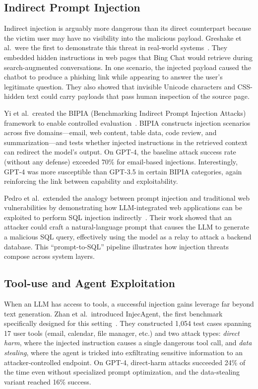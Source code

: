 \subsection{Indirect Prompt Injection}

Indirect injection is arguably more dangerous than its direct counterpart because the victim user may have no visibility into the malicious payload. Greshake et al.\ were the first to demonstrate this threat in real-world systems~\cite{greshake2023indirect}. They embedded hidden instructions in web pages that Bing Chat would retrieve during search-augmented conversations. In one scenario, the injected payload caused the chatbot to produce a phishing link while appearing to answer the user's legitimate question. They also showed that invisible Unicode characters and CSS-hidden text could carry payloads that pass human inspection of the source page.

Yi et al.\ created the BIPIA (Benchmarking Indirect Prompt Injection Attacks) framework to enable controlled evaluation~\cite{yi2023bipia}. BIPIA constructs injection scenarios across five domains---email, web content, table data, code review, and summarization---and tests whether injected instructions in the retrieved context can redirect the model's output. On GPT-4, the baseline attack success rate (without any defense) exceeded 70\% for email-based injections. Interestingly, GPT-4 was more susceptible than GPT-3.5 in certain BIPIA categories, again reinforcing the link between capability and exploitability.

Pedro et al.\ extended the analogy between prompt injection and traditional web vulnerabilities by demonstrating how LLM-integrated web applications can be exploited to perform SQL injection indirectly~\cite{pedro2023prompt}. Their work showed that an attacker could craft a natural-language prompt that causes the LLM to generate a malicious SQL query, effectively using the model as a relay to attack a backend database. This ``prompt-to-SQL'' pipeline illustrates how injection threats compose across system layers.

\subsection{Tool-use and Agent Exploitation}

When an LLM has access to tools, a successful injection gains leverage far beyond text generation. Zhan et al.\ introduced InjecAgent, the first benchmark specifically designed for this setting~\cite{zhan2024injecagent}. They constructed 1{,}054 test cases spanning 17 user tools (email, calendar, file manager, etc.) and two attack types: \emph{direct harm}, where the injected instruction causes a single dangerous tool call, and \emph{data stealing}, where the agent is tricked into exfiltrating sensitive information to an attacker-controlled endpoint. On GPT-4, direct-harm attacks succeeded 24\% of the time even without specialized prompt optimization, and the data-stealing variant reached 16\% success.

